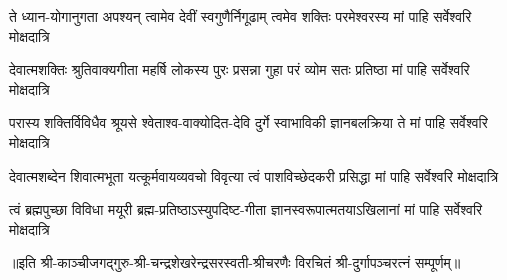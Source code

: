 

\fourlineindentedshloka
{ते ध्यान-योगानुगता अपश्यन्}
{त्वामेव देवीं स्वगुणैर्निगूढाम्}
{त्वमेव शक्तिः परमेश्वरस्य}
{मां पाहि सर्वेश्वरि मोक्षदात्रि}%

\fourlineindentedshloka
{देवात्मशक्तिः श्रुतिवाक्यगीता}
{महर्षि लोकस्य पुरः प्रसन्ना}
{गुहा परं व्योम सतः प्रतिष्ठा}
{मां पाहि सर्वेश्वरि मोक्षदात्रि}%

\fourlineindentedshloka
{परास्य शक्तिर्विविधैव श्रूयसे}
{श्वेताश्व-वाक्योदित-देवि दुर्गे}
{स्वाभाविकी ज्ञानबलक्रिया ते}
{मां पाहि सर्वेश्वरि मोक्षदात्रि}%

\fourlineindentedshloka
{देवात्मशब्देन शिवात्मभूता}
{यत्कूर्मवायव्यवचो विवृत्या}
{त्वं पाशविच्छेदकरी प्रसिद्धा}
{मां पाहि सर्वेश्वरि मोक्षदात्रि}%

\fourlineindentedshloka
{त्वं ब्रह्मपुच्छा विविधा मयूरी}
{ब्रह्म-प्रतिष्ठाऽस्युपदिष्ट-गीता}
{ज्ञानस्वरूपात्मतयाऽखिलानां}
{मां पाहि सर्वेश्वरि मोक्षदात्रि}%

{॥इति श्री-काञ्चीजगद्गुरु-श्री-चन्द्रशेखरेन्द्रसरस्वती-श्रीचरणैः विरचितं श्री-दुर्गापञ्चरत्नं सम्पूर्णम्॥}

